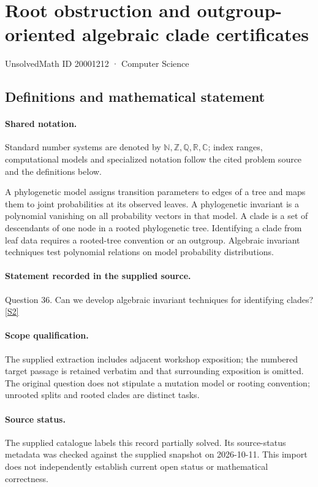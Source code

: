 \documentclass[11pt]{article}
\newcommand{\sref}[2]{\hyperlink{source:#1:#2}{[S#2]}}
\begin{document}
\setcounter{section}{20001211}
\section{Root obstruction and outgroup-oriented algebraic clade certificates}\label{20001212}
{\small\sffamily UnsolvedMath ID 20001212 · Computer Science}
\subsection{Definitions and mathematical statement}

\paragraph{Shared notation.}Standard number systems are denoted by $\mathbb N,\mathbb Z,\mathbb Q,\mathbb R,\mathbb C$; index ranges, computational models and specialized notation follow the cited problem source and the definitions below.


A phylogenetic model assigns transition parameters to edges of a tree and maps them to joint probabilities at its observed leaves. A phylogenetic invariant is a polynomial vanishing on all probability vectors in that model. A clade is a set of descendants of one node in a rooted phylogenetic tree. Identifying a clade from leaf data requires a rooted-tree convention or an outgroup. Algebraic invariant techniques test polynomial relations on model probability distributions.
\paragraph{Statement recorded in the supplied source.}
Question 36. Can we develop algebraic invariant techniques for identifying clades? \sref{20001212}{2}
\paragraph{Scope qualification.}
The supplied extraction includes adjacent workshop exposition; the numbered target passage is retained verbatim and that surrounding exposition is omitted. The original question does not stipulate a mutation model or rooting convention; unrooted splits and rooted clades are distinct tasks.
\paragraph{Source status.}
The supplied catalogue labels this record partially solved. Its source-status metadata was checked against the supplied snapshot on 2026-10-11. This import does not independently establish current open status or mathematical correctness.
\end{document}
